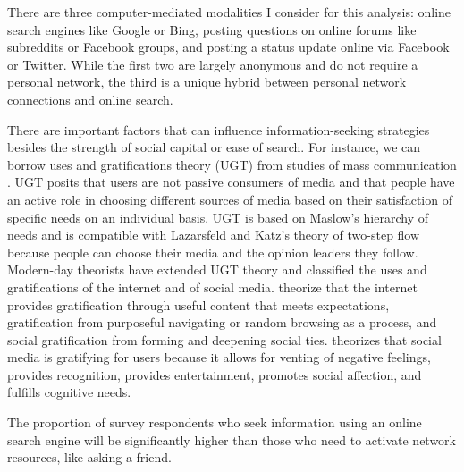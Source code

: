 There are three computer-mediated modalities I consider for this analysis: online
search engines like Google or Bing, posting questions on online forums like
subreddits or Facebook groups, and posting a status update online via Facebook
or Twitter. While the first two are largely anonymous and do not require a
personal network, the third is a unique hybrid between personal network
connections and online search.

There are important factors that can influence information-seeking strategies
besides the strength of social capital or ease of search. For instance, we can
borrow uses and gratifications theory (UGT) from studies of mass communication
\citep{blumlerUsesMassCommunications1974, tanMassCommunicationTheories1985}. 
UGT posits that users are not passive consumers of media and that people have an
active role in choosing different sources of media based on their satisfaction
of specific needs on an individual basis. UGT is based on Maslow’s  
\citeyear{maslowTheoryHumanMotivation1943} hierarchy of needs and is compatible with
Lazarsfeld and Katz’s theory of two-step flow \cite{katzPersonalInfluencePart1955}
because people can choose their media and the opinion leaders they follow.
Modern-day theorists have extended UGT theory and classified the uses and
gratifications of the internet and of social media. 
\citet{staffordDeterminingUsesGratifications2004} theorize that the internet
provides gratification through useful content that meets expectations,
gratification from purposeful navigating or random browsing as a process, and
social gratification from forming and deepening social ties. 
\citet{leungGenerationalDifferencesContent2013} theorizes that social media is
gratifying for users because it allows for venting of negative feelings,
provides recognition, provides entertainment, promotes social affection, and
fulfills cognitive needs. 

\begin{hyp} \label{hyp:online-vs-network}
The proportion of survey respondents who seek information
using an online search engine will be significantly higher than those who
need to activate network resources, like asking a friend.
\end{hyp}

